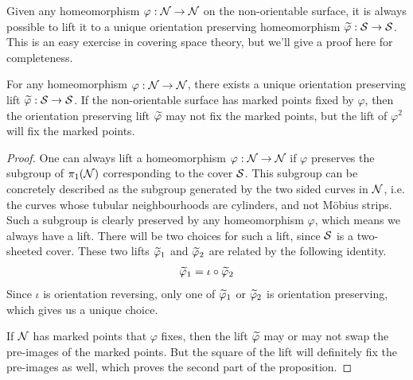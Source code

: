 Given any homeomorphism $\varphi: \mathcal{N} \to \mathcal{N}$ on the non-orientable surface, it is always possible
to lift it to a unique orientation preserving homeomorphism $\widetilde{\varphi}: \mathcal{S} \to \mathcal{S}$. This is an
easy exercise in covering space theory, but we'll give a proof here for completeness.
\begin{prop}
  For any homeomorphism $\varphi: \mathcal{N} \to \mathcal{N}$, there exists a unique orientation preserving lift
  $\widetilde{\varphi}: \mathcal{S} \to \mathcal{S}$. If the non-orientable surface has marked points fixed by $\varphi$,
  then the orientation preserving lift $\widetilde{\varphi}$ may not fix the marked points, but the lift
  of $\varphi^2$ will fix the marked points.
\end{prop}
\begin{proof}
  One can always lift a homeomorphism $\varphi: \mathcal{N} \to \mathcal{N}$ if $\varphi$ preserves the subgroup of
  $\pi_1(\mathcal{N})$ corresponding to the cover $\mathcal{S}$. This subgroup can be concretely described as the
  subgroup generated by the two sided curves in $\mathcal{N}$, i.e. the curves whose tubular neighbourhoods
  are cylinders, and not M\"obius strips. Such a subgroup is clearly preserved by any homeomorphism
  $\varphi$, which means we always have a lift. There will be two choices for such a lift, since
  $\mathcal{S}$ is a two-sheeted cover. These two lifts $\widetilde{\varphi}_1$ and $\widetilde{\varphi}_2$ are related
  by the following identity.
  \begin{align*}
    \widetilde{\varphi}_1 = \iota \circ \widetilde{\varphi}_2
  \end{align*}
  Since $\iota$ is orientation reversing, only one of $\widetilde{\varphi}_1$ or $\widetilde{\varphi}_2$ is
  orientation preserving, which gives us a unique choice.

  If $\mathcal{N}$ has marked points that $\varphi$ fixes, then the lift $\widetilde{\varphi}$ may or may not swap
  the pre-images of the marked points. But the square of the lift will definitely fix the
  pre-images as well, which proves the second part of the proposition.
\end{proof}

